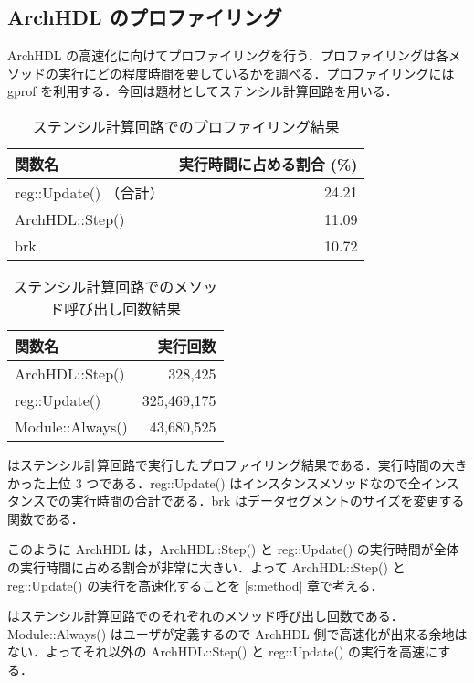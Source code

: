 

\subsection{ArchHDL のプロファイリング \label{ss:profiling}}

ArchHDL
の高速化に向けてプロファイリングを行う．プロファイリングは各メソッドの実行にどの程度時間を要しているかを調べる．プロファイリングには
gprof
\cite{gprof}を利用する．今回は題材としてステンシル計算回路を用いる．

\begin{table}[t]
 \caption{ステンシル計算回路でのプロファイリング結果}
 \label{table:stencil_prof}
 \begin{center}
  \begin{tabular}{lr} \toprule
  関数名 & 実行時間に占める割合 (\%) \\ \midrule
  reg::Update() （合計） & 24.21 \\
  ArchHDL::Step() & 11.09 \\
  brk & 10.72 \\ \bottomrule
  \end{tabular}
 \end{center}
\end{table}

\begin{table}[t]
 \caption{ステンシル計算回路でのメソッド呼び出し回数結果}
 \label{table:stencil_method_call_count}
 \begin{center}
  \begin{tabular}{lr} \toprule
  関数名 & 実行回数 \\ \midrule
  ArchHDL::Step()   &     328,425 \\
  reg::Update()     & 325,469,175 \\
  Module::Always()  &  43,680,525 \\ \bottomrule
  \end{tabular}
 \end{center}
\end{table}

はステンシル計算回路で実行したプロファイリング結果である．実行時間の大きかった上位
3 つである．reg::Update()
はインスタンスメソッドなので全インスタンスでの実行時間の合計である．brk
はデータセグメントのサイズを変更する関数である．

このように ArchHDL は，ArchHDL::Step() と reg::Update()
の実行時間が全体の実行時間に占める割合が非常に大きい．よって
ArchHDL::Step() と reg::Update() の実行を高速化することを \ref{s:method}
章で考える．

はステンシル計算回路でのそれぞれのメソッド呼び出し回数である．Module::Always()
はユーザが定義するので ArchHDL
側で高速化が出来る余地はない．よってそれ以外の ArchHDL::Step() と
reg::Update() の実行を高速にする．
